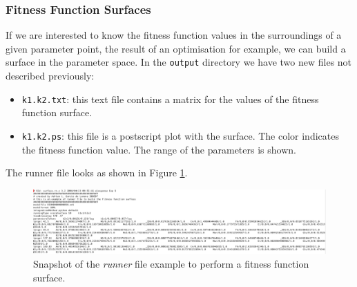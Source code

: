 \documentclass[a4paper, 11pt]{article}
\begin{document}
  \subsubsection{Fitness Function Surfaces}
  If we are interested to know the fitness function values in the surroundings of a given parameter point, the result of an optimisation for example, we can build a surface in the parameter space.
  In the \texttt{output} directory we have two new files not described previously:
  \begin{itemize}
    \item \texttt{k1.k2.txt}: this text file contains a matrix for the values of the fitness function surface.
    \item \texttt{k1.k2.ps}: this file is a postscript plot with the surface.
      The color indicates the fitness function value.
      The range of the parameters is shown.
  \end{itemize}
  The runner file looks as shown in Figure \ref{surfaceRunner}.
  \begin{figure}[t]
    \begin{center}
      \includegraphics[scale=.38]{figures/surfaceRunner.eps}
      \caption{Snapshot of the \emph{runner} file example to perform a fitness function surface.}
      \label{surfaceRunner}
    \end{center}
  \end{figure}
\end{document}
